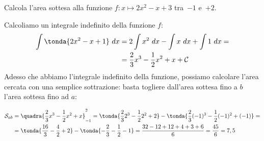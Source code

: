 \begin{esempio}
Calcola l'area sottesa alla funzione \quad
\(f: x \mapsto 2 x^2 -x +3\) \quad 
tra~\(-1\) e~\(+2\).

\begin{minipage}{.59 \textwidth}
Calcoliamo un integrale indefinito della funzione \(f\):
\begin{align*} 
\int \tonda{2 x^2 -x +1}~dx &= 2 \int x^2~dx -\int x~dx + \int 1~dx = \\
                         &= \frac{2}{3}x^3 - \frac{1}{2}x^2 + x + \mathcal{C}
\end{align*}
Adesso che abbiamo l'integrale indefinito della funzione, possiamo calcolare 
l'area cercata con una semplice sottrazione: basta togliere dall'area 
sottesa fino a \(b\) l'area sottesa fino ad \(a\):
\end{minipage}
\hfill
\begin{minipage}{.39 \textwidth}
\begin{inaccessibleblock}[]  
  \begin{center} \intdef \end{center}
\end{inaccessibleblock}
\end{minipage}

\begin{align*}
\mathcal{S}_{ab} &= 
  \quadra{\frac{2}{3}x^3 - \frac{1}{2}x^2 + x}_{-1}^{2} = 
  \tonda{\frac{2}{3}2^3 - \frac{1}{2}2^2 + 2} -
     \tonda{\frac{2}{3}(-1)^3 - \frac{1}{2}(-1)^2 +(-1)} = \\
  &= \tonda{\frac{16}{3} - \frac{4}{2} + 2} - 
     \tonda{-\frac{2}{3} - \frac{1}{2} -1} = 
  \frac{32 -12 +12 +4 +3 +6}{6} = \frac{45}{6} = 7,5
\end{align*} 


 
\end{esempio}

